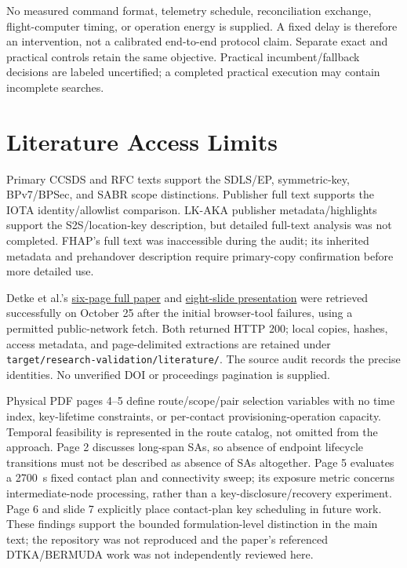 \documentclass[11pt]{article}
\begin{document}
No measured command format, telemetry schedule, reconciliation exchange, flight-computer timing, or operation energy is supplied. A fixed delay is therefore an intervention, not a calibrated end-to-end protocol claim. Separate exact and practical controls retain the same objective. Practical incumbent/fallback decisions are labeled uncertified; a completed practical execution may contain incomplete searches.

\section{Literature Access Limits}
Primary CCSDS and RFC texts support the SDLS/EP, symmetric-key, BPv7/BPSec, and SABR scope distinctions. Publisher full text supports the IOTA identity/allowlist comparison. LK-AKA publisher metadata/highlights support the S2S/location-key description, but detailed full-text analysis was not completed. FHAP's full text was inaccessible during the audit; its inherited metadata and prehandover description require primary-copy confirmation before more detailed use.

Detke et al.'s \href{https://stintworkshops.org/papers/stint2026-19-detke.pdf}{six-page full paper} and \href{https://stintworkshops.org/slides/stint2026-slides-detke.pdf}{eight-slide presentation} were retrieved successfully on October 25 after the initial browser-tool failures, using a permitted public-network fetch. Both returned HTTP 200; local copies, hashes, access metadata, and page-delimited extractions are retained under \texttt{target/research-validation/literature/}. The source audit records the precise identities. No unverified DOI or proceedings pagination is supplied.

Physical PDF pages 4--5 define route/scope/pair selection variables with no time index, key-lifetime constraints, or per-contact provisioning-operation capacity. Temporal feasibility is represented in the route catalog, not omitted from the approach. Page 2 discusses long-span SAs, so absence of endpoint lifecycle transitions must not be described as absence of SAs altogether. Page 5 evaluates a 2700~s fixed contact plan and connectivity sweep; its exposure metric concerns intermediate-node processing, rather than a key-disclosure/recovery experiment. Page 6 and slide 7 explicitly place contact-plan key scheduling in future work. These findings support the bounded formulation-level distinction in the main text; the repository was not reproduced and the paper's referenced DTKA/BERMUDA work was not independently reviewed here.
\end{document}
